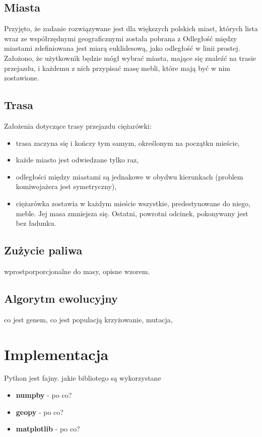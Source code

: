\documentclass[12pt, oneside, final]{report}
\begin{document}
\subsection{Miasta}
Przyjęto, że zadanie rozwiązywane jest dla większych polskich miast, których lista wraz ze współrzędnymi geograficznymi została pobrana z %
Odległość między miastami zdefiniowana jest miarą euklidesową, jako odległość w linii prostej. Założono, że użytkownik będzie mógł wybrać miasta, mające się znaleźć na trasie przejazdu, i każdemu z nich przypisać masę mebli, które mają być w nim zostawione.

\subsection{Trasa}
Założenia dotyczące trasy przejazdu ciężarówki:
\begin{itemize}
\item trasa zaczyna się i kończy tym samym, określonym na początku mieście,
\item każde miasto jest odwiedzane tylko raz,
\item odległości między miastami są jednakowe w obydwu kierunkach (problem komiwojażera jest symetryczny),
\item ciężarówka zostawia w każdym mieście wszystkie, predestynowane do niego, meble. Jej masa zmniejsza się. Ostatni, powrotni odcinek, pokonywany jest bez ładunku.
\end{itemize}

\subsection{Zużycie paliwa}
wprostporporcjonalne do masy, opisne wzorem.

\subsection{Algorytm ewolucyjny}
co jest genem,
co jest populacją
krzyżowanie,
mutacja,


\section{Implementacja}
Python jest fajny. jakie bibliotego są wykorzystane
\begin{itemize}
\item \textbf{numpby} - po co?
\item \textbf{geopy} - po co?
\item \textbf{matplotlib} - po co?
\end{itemize}
\end{document}
